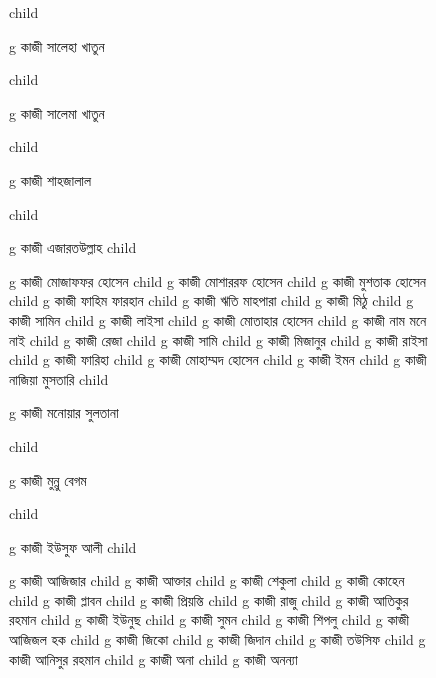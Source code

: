 \documentclass{article}
\begin{document}
\begin{figure}
{\begin{genealogypicture}
{{{{{%
        }%
        child{
          g{ কাজী সালেহা খাতুন }

        }%
        child{
          g{ কাজী সালেমা খাতুন }

        }%
        child{
          g{ কাজী শাহজালাল }

        }
      }
        child{
        g{ কাজী এজারতউল্লাহ  }
          child{    g{ কাজী মোজাফফর হোসেন }
              child{
                g{ কাজী মোশাররফ হোসেন }
                  child{    g{ কাজী মুশতাক হোসেন }
                    child{    g{ কাজী ফাহিম ফারহান }   }
                    child{    g{ কাজী ঋতি মাহপারা }   }
                  }
                  child{    g{ কাজী মিঠু }
                    child{    g{ কাজী সামিন  }   }
                    child{    g{ কাজী লাইসা }   }
                  }
              }
              child{
              g{ কাজী মোতাহার হোসেন  }
              child{    g{ কাজী নাম মনে নাই  }   }
              child{    g{ কাজী রেজা } 
                  child{    g{ কাজী সামি }   }
              }
              child{    g{ কাজী মিজানুর }  
                  child{    g{ কাজী রাইসা }   }
                  child{    g{ কাজী ফারিহা }   }
              }
            }
            child{
              g{ কাজী মোহাম্মদ হোসেন }
              child{    g{ কাজী ইমন  }   }
              child{    g{ কাজী নাজিয়া মুসতারি }   }
            }
            child{
              g{ কাজী মনোয়ার সুলতানা }

            }%
            child{
              g{ কাজী মুন্নু বেগম }

            }

          }       
        }
      }
      child{
        g{ কাজী ইউসুফ আলী }
          child{    g{ কাজী আজিজার } 
              child{    g{ কাজী আক্তার }
                child{    g{ কাজী শেকুলা }   }
                child{    g{ কাজী কোহেন } 
                    child{    g{ কাজী প্লাবন }   }
                    child{    g{ কাজী প্রিয়ন্তি }   }
                  }
                child{    g{ কাজী রাজু }   }  
              }
              child{    g{ কাজী আতিকুর রহমান }   }
              child{    g{ কাজী ইউনুছ } 
                  child{    g{ কাজী সুমন }   }
                  child{    g{ কাজী শিপলু  }   }
              }
              child{    g{ কাজী আজিজল হক }
                  child{    g{ কাজী জিকো } child{    g{ কাজী জিদান }   }   }
                  child{    g{ কাজী তউসিফ }   }
              }
              child{    g{ কাজী আনিসুর রহমান } 
                  child{    g{ কাজী অনা  }   }
                  child{    g{ কাজী অনন্যা }   }
              }

}}}}
\end{genealogypicture}}
\end{figure}
\end{document}
